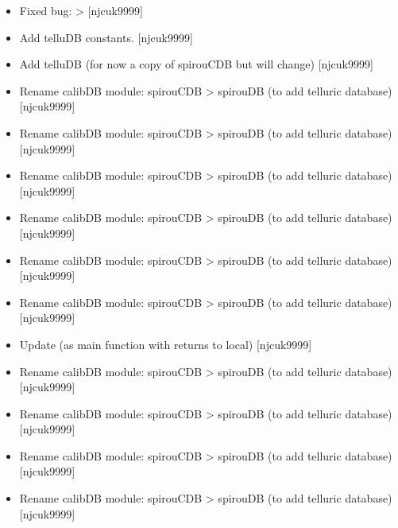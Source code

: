 \documentclass[a4paper,10pt,english]{report}
\begin{document}
\begin{itemize}
\item {} 
Fixed bug:  \textendash{}\textgreater{}  {[}njcuk9999{]}

\item {} 
Add telluDB constants. {[}njcuk9999{]}

\item {} 
Add telluDB (for now a copy of spirouCDB \sphinxhyphen{} but will change)
{[}njcuk9999{]}

\item {} 
Rename calibDB module: spirouCDB \textendash{}\textgreater{} spirouDB (to add telluric
database) {[}njcuk9999{]}

\item {} 
Rename calibDB module: spirouCDB \textendash{}\textgreater{} spirouDB (to add telluric
database) {[}njcuk9999{]}

\item {} 
Rename calibDB module: spirouCDB \textendash{}\textgreater{} spirouDB (to add telluric
database) {[}njcuk9999{]}

\item {} 
Rename calibDB module: spirouCDB \textendash{}\textgreater{} spirouDB (to add telluric
database) {[}njcuk9999{]}

\item {} 
Rename calibDB module: spirouCDB \textendash{}\textgreater{} spirouDB (to add telluric
database) {[}njcuk9999{]}

\item {} 
Rename calibDB module: spirouCDB \textendash{}\textgreater{} spirouDB (to add telluric
database) {[}njcuk9999{]}

\item {} 
Update  (as main function with returns to local)
{[}njcuk9999{]}

\item {} 
Rename calibDB module: spirouCDB \textendash{}\textgreater{} spirouDB (to add telluric
database) {[}njcuk9999{]}

\item {} 
Rename calibDB module: spirouCDB \textendash{}\textgreater{} spirouDB (to add telluric
database) {[}njcuk9999{]}

\item {} 
Rename calibDB module: spirouCDB \textendash{}\textgreater{} spirouDB (to add telluric
database) {[}njcuk9999{]}

\item {} 
Rename calibDB module: spirouCDB \textendash{}\textgreater{} spirouDB (to add telluric
database) {[}njcuk9999{]}


\end{itemize}
\end{document}
